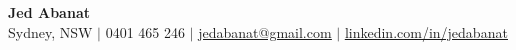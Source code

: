 \begin{center}
    {\Huge \textbf{Jed Abanat}} \\
        \vspace{4pt}
        Sydney, NSW $|$ 
        0401 465 246 $|$ 
        \href{mailto:jedabanat@gmail.com}{\underline{jedabanat@gmail.com}} $|$ 
        \href{https://linkedin.com/in/jedabanat}{\underline{linkedin.com/in/jedabanat}}
\end{center}